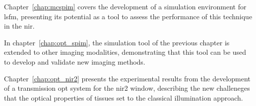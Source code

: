 Chapter~\ref{chap:mcspim} covers the development of a simulation environment for \gls{lsfm}, presenting its potential as a tool to assess the performance of this technique in the \gls{nir}.

In chapter~\ref{chap:opt_spim}, the simulation tool of the previous chapter is extended to other imaging modalities, demonstrating that this tool can be used to develop and validate new imaging methods.

Chapter~\ref{chap:opt_nir2} presents the experimental results from the development of a transmission \gls{opt} system for the \gls{nir2} window, describing the new challeneges that the optical properties of tissues set to the classical illumination approach.